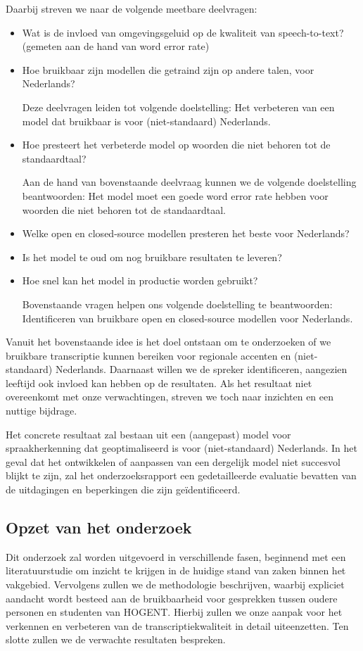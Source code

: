 Daarbij streven we naar de volgende meetbare deelvragen:
\begin{itemize}
        \item{Wat is de invloed van omgevingsgeluid op de kwaliteit van speech-to-text? (gemeten aan de hand van word error rate)}
        \item{Hoe bruikbaar zijn modellen die getraind zijn op andere talen, voor Nederlands?}
        
    Deze deelvragen leiden tot volgende doelstelling: Het verbeteren van een model dat bruikbaar is voor (niet-standaard) Nederlands.
        
        \item{Hoe presteert het verbeterde model op woorden die niet behoren tot de standaardtaal?}
       
     
     Aan de hand van bovenstaande deelvraag kunnen we de volgende doelstelling beantwoorden: Het model moet een goede word error rate hebben voor woorden die niet behoren tot de standaardtaal.
        
        \item{Welke open en closed-source modellen presteren het beste voor Nederlands?}
         \item{Is het model te oud om nog bruikbare resultaten te leveren?}
         \item{Hoe snel kan het model in productie worden gebruikt?}
     
     Bovenstaande vragen helpen ons volgende doelstelling te beantwoorden: Identificeren van bruikbare open en closed-source modellen voor Nederlands.
\end{itemize}

Vanuit het bovenstaande idee is het doel ontstaan om te onderzoeken of we bruikbare transcriptie kunnen bereiken voor regionale accenten en (niet-standaard) Nederlands. Daarnaast willen we de spreker identificeren, aangezien leeftijd ook invloed kan hebben op de resultaten. Als het resultaat niet overeenkomt met onze verwachtingen, streven we toch naar inzichten en een nuttige bijdrage.

Het concrete resultaat zal bestaan uit een (aangepast) model voor spraakherkenning dat geoptimaliseerd is voor (niet-standaard) Nederlands. In het geval dat het ontwikkelen of aanpassen van een dergelijk model niet succesvol blijkt te zijn, zal het onderzoeksrapport een gedetailleerde evaluatie bevatten van de uitdagingen en beperkingen die zijn geïdentificeerd.

\subsection{Opzet van het onderzoek}
Dit onderzoek zal worden uitgevoerd in verschillende fasen, beginnend met een literatuurstudie om inzicht te krijgen in de huidige stand van zaken binnen het vakgebied. Vervolgens zullen we de methodologie beschrijven, waarbij expliciet aandacht wordt besteed aan de bruikbaarheid voor gesprekken tussen oudere personen en studenten van HOGENT. Hierbij zullen we onze aanpak voor het verkennen en verbeteren van de transcriptiekwaliteit in detail uiteenzetten. Ten slotte zullen we de verwachte resultaten bespreken.

